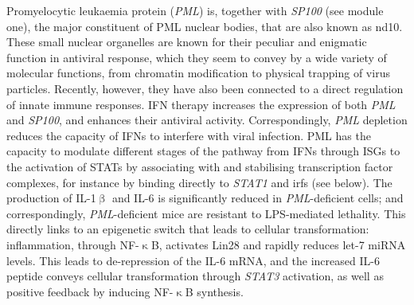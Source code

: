 Promyelocytic leukaemia protein (\emph{PML}) is, together with \emph{SP100} (see module one), the major constituent of PML nuclear bodies, that are also known as \ac{nd10}. These small nuclear organelles are known for their peculiar and enigmatic function in antiviral response, which they seem to convey by a wide variety of molecular functions, from chromatin modification to physical trapping of virus particles.\cite{} Recently, however, they have also been connected to a direct regulation of innate immune responses. IFN therapy increases the expression of both \emph{PML} and \emph{SP100}, and enhances their antiviral activity.\cite{Regad2001} Correspondingly, \emph{PML} depletion reduces the capacity of IFNs to interfere with viral infection.\cite{Chee2003} PML has the capacity to modulate different stages of the pathway from IFNs through ISGs to the activation of STATs by associating with and stabilising transcription factor complexes, for instance by binding directly to \emph{STAT1} and \acp{irf} (see below).\cite{Chen2015} The production of IL-1$\upbeta$ and IL-6 is significantly reduced in \emph{PML}-deficient cells;\cite{Lo2013} and correspondingly, \emph{PML}-deficient mice are resistant to LPS-mediated lethality.\cite{Lunardi2011} This directly links to an epigenetic switch that leads to cellular transformation: inflammation, through NF-$\upkappa$B, activates Lin28 and rapidly reduces let-7 miRNA levels. This leads to de-repression of the IL-6 mRNA, and the increased IL-6 peptide conveys cellular transformation through \emph{STAT3} activation, as well as positive feedback by inducing NF-$\upkappa$B synthesis.\cite{Iliopoulos2009}

